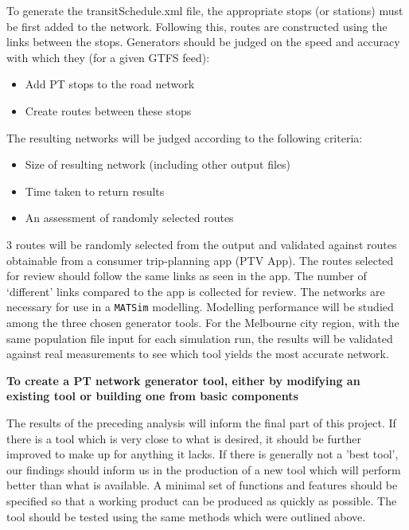 \documentclass[11pt]{article}
\begin{document}
To generate the transitSchedule.xml file, the appropriate stops (or stations) must be first added to the network. Following this, routes are constructed using the links between the stops. Generators should be judged on the speed and accuracy with which they (for a given GTFS feed):

\begin{itemize}
\item Add PT stops to the road network
\item Create routes between these stops
\end{itemize}

The resulting networks will be judged according to the following criteria:

\begin{itemize}
\item Size of resulting network (including other output files)
\item Time taken to return results
\item An assessment of randomly selected routes
\end{itemize}

3 routes will be randomly selected from the output and validated against routes obtainable from a consumer trip-planning app (PTV App). The routes selected for review should follow the same links as seen in the app. The number of ‘different’ links compared to the app is collected for review.
The networks are necessary for use in a \texttt{MATSim} modelling. Modelling performance will be studied among the three chosen generator tools. For the Melbourne city region, with the same population file input for each simulation run, the results will be validated against real measurements to see which tool yields the most accurate network.

\textbf{To create a PT network generator tool, either by modifying an existing tool or building one from basic components}

The results of the preceding analysis will inform the final part of this project. If there is a tool which is very close to what is desired, it should be further improved to make up for anything it lacks. If there is generally not a 'best tool', our findings should inform us in the production of a new tool which will perform better than what is available.
A minimal set of functions and features should be specified so that a working product can be produced as quickly as possible. The tool should be tested using the same methods which were outlined above.
\end{document}
